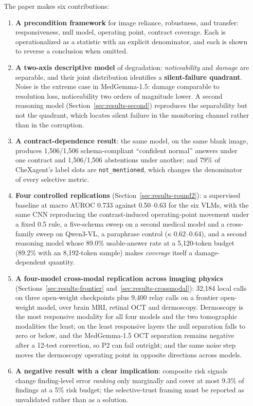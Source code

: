 The paper makes six contributions:
\begin{enumerate}[leftmargin=1.2em,itemsep=2pt,topsep=2pt]
\item \textbf{A precondition framework} for image reliance, robustness, and transfer: responsiveness, null model, operating point, contract coverage. Each is operationalized as a statistic with an explicit denominator, and each is shown to reverse a conclusion when omitted.
\item \textbf{A two-axis descriptive model} of degradation: \emph{noticeability} and \emph{damage} are separable, and their joint distribution identifies a \textbf{silent-failure quadrant}. Noise is the extreme case in MedGemma-1.5: damage comparable to resolution loss, noticeability two orders of magnitude lower. A second reasoning model (Section~\ref{sec:results-second}) reproduces the separability but not the quadrant, which locates silent failure in the monitoring channel rather than in the corruption.
\item \textbf{A contract-dependence result}: the same model, on the same blank image, produces 1,506/1,506 schema-compliant ``confident normal'' answers under one contract and 1,506/1,506 abstentions under another; and 79\% of CheXagent's label slots are \texttt{not\_mentioned}, which changes the denominator of every selective metric.
\item \textbf{Four controlled replications} (Section~\ref{sec:results-round2}): a supervised baseline at macro AUROC 0.733 against 0.50--0.63 for the six VLMs, with the same CNN reproducing the contrast-induced operating-point movement under a fixed 0.5 rule, a five-schema sweep on a second medical model and a cross-family sweep on Qwen3-VL, a paraphrase control ($\kappa$ 0.62--0.64), and a second reasoning model whose 89.0\% usable-answer rate at a 5,120-token budget (89.2\% with an 8,192-token sample) makes \emph{coverage} itself a damage-dependent quantity.
\item \textbf{A four-model cross-modal replication across imaging physics} (Sections~\ref{sec:results-frontier} and~\ref{sec:results-crossmodal}): 32,184 local calls on three open-weight checkpoints plus 9,400 relay calls on a frontier open-weight model, over brain MRI, retinal OCT and dermoscopy. Dermoscopy is the most responsive modality for all four models and the two tomographic modalities the least; on the least responsive layers the null separation falls to zero or below, and the MedGemma-1.5 OCT separation remains negative after a 12-test correction, so P2 can fail outright; and the same noise step moves the dermoscopy operating point in opposite directions across models.
\item \textbf{A negative result with a clear implication}: composite risk signals change finding-level error \emph{ranking} only marginally and cover at most 9.3\% of findings at a 5\% risk budget; the selective-trust framing must be reported as unvalidated rather than as a solution.
\end{enumerate}

